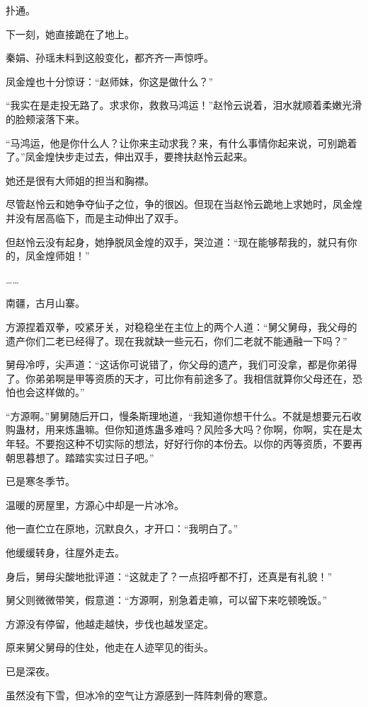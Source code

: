 \begin{this_body}
扑通。

下一刻，她直接跪在了地上。

秦娟、孙瑶未料到这般变化，都齐齐一声惊呼。

凤金煌也十分惊讶：“赵师妹，你这是做什么？”

“我实在是走投无路了。求求你，救救马鸿运！”赵怜云说着，泪水就顺着柔嫩光滑的脸颊滚落下来。

“马鸿运，他是你什么人？让你来主动求我？来，有什么事情你起来说，可别跪着了。”凤金煌快步走过去，伸出双手，要搀扶赵怜云起来。

她还是很有大师姐的担当和胸襟。

尽管赵怜云和她争夺仙子之位，争的很凶。但现在当赵怜云跪地上求她时，凤金煌并没有居高临下，而是主动伸出了双手。

但赵怜云没有起身，她挣脱凤金煌的双手，哭泣道：“现在能够帮我的，就只有你的，凤金煌师姐！”

……

南疆，古月山寨。

方源捏着双拳，咬紧牙关，对稳稳坐在主位上的两个人道：“舅父舅母，我父母的遗产你们二老已经得了。现在我就缺一些元石，你们二老就不能通融一下吗？”

舅母冷哼，尖声道：“这话你可说错了，你父母的遗产，我们可没拿，都是你弟得了。你弟弟啊是甲等资质的天才，可比你有前途多了。我相信就算你父母还在，恐怕也会这样做的。”

“方源啊。”舅舅随后开口，慢条斯理地道，“我知道你想干什么。不就是想要元石收购蛊材，用来炼蛊嘛。但你知道炼蛊多难吗？风险多大吗？你啊，你啊，实在是太年轻。不要抱这种不切实际的想法，好好行你的本份去。以你的丙等资质，不要再朝思暮想了。踏踏实实过日子吧。”

已是寒冬季节。

温暖的房屋里，方源心中却是一片冰冷。

他一直伫立在原地，沉默良久，才开口：“我明白了。”

他缓缓转身，往屋外走去。

身后，舅母尖酸地批评道：“这就走了？一点招呼都不打，还真是有礼貌！”

舅父则微微带笑，假意道：“方源啊，别急着走嘛，可以留下来吃顿晚饭。”

方源没有停留，他越走越快，步伐也越发坚定。

原来舅父舅母的住处，他走在人迹罕见的街头。

已是深夜。

虽然没有下雪，但冰冷的空气让方源感到一阵阵刺骨的寒意。


\end{this_body}
